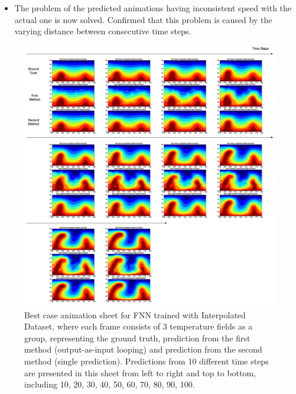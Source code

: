 {\begin{itemize}
\begin{itemize}
            \item The problem of the predicted animations having inconsistent speed with the actual one is now solved. Confirmed that this problem is caused by the varying distance between consecutive time steps.
            
    \end{itemize} 
       
\end{itemize}

\begin{figure}[H]
    \centering
    \includegraphics[width=0.9\linewidth]{figures/FNN_animation_sheet.png}
    \caption{Best case animation sheet for FNN trained with Interpolated Dataset, where each frame consists of 3 temperature fields as a group, representing the ground truth, prediction from the first method (output-as-input looping) and prediction from the second method (single prediction). Predictions from 10 different time steps are presented in this sheet from left to right and top to bottom, including 10, 20, 30, 40, 50, 60, 70, 80, 90, 100.}
\end{figure}

}

